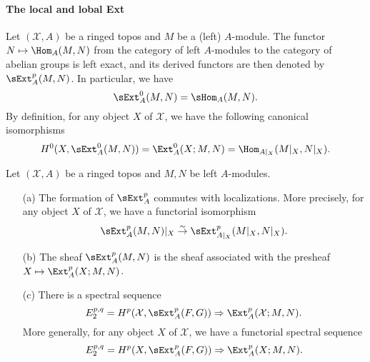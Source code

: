 \paragraph{The local and lobal Ext}
Let $(\mathcal{X},A)$ be a ringed topos and $M$ be a (left) $A$-module. The functor $N\mapsto\Hom_A(M,N)$ from the category of left $A$-modules to the category of abelian groups is left exact, and its derived functors are then denoted by $\sExt_A^p(M,N)$. In particular, we have
\[\sExt_A^0(M,N)=\sHom_A(M,N).\]
By definition, for any object $X$ of $\mathcal{X}$, we have the following canonical isomorphisms
\[H^0(X,\sExt_A^0(M,N))=\Ext_A^0(X;M,N)=\Hom_{A|_X}(M|_X,N|_X).\]

\begin{proposition}\label{ringed topos sExt porp}
Let $(\mathcal{X},A)$ be a ringed topos and $M,N$ be left $A$-modules.
\begin{enumerate}
    \item[(a)] The formation of $\sExt_A^p$ commutes with localizations. More precisely, for any object $X$ of $\mathcal{X}$, we have a functorial isomorphism
    \begin{equation}\label{ringed topos sExt porp-1}
        \sExt_A^p(M,N)|_X \stackrel{\sim}{\to } \sExt_{A|_X}^p(M|_X,N|_X).
    \end{equation}
    \item[(b)] The sheaf $\sExt_A^p(M,N)$ is the sheaf associated with the presheaf $X\mapsto\Ext_A^p(X;M,N)$.
    \item[(c)] There is a spectral sequence
    \begin{equation}\label{ringed topos sExt porp-2}
        E_2^{p,q}=H^p(\mathcal{X},\sExt_A^p(F,G))\Rightarrow \Ext_A^p(\mathcal{X};M,N).
    \end{equation}
    More generally, for any object $X$ of $\mathcal{X}$, we have a functorial spectral sequence
    \begin{equation}\label{ringed topos sExt porp-3}
        E_2^{p,q}=H^p(X,\sExt_A^p(F,G))\Rightarrow \Ext_A^p(X;M,N).
    \end{equation}
\end{enumerate}
\end{proposition}

